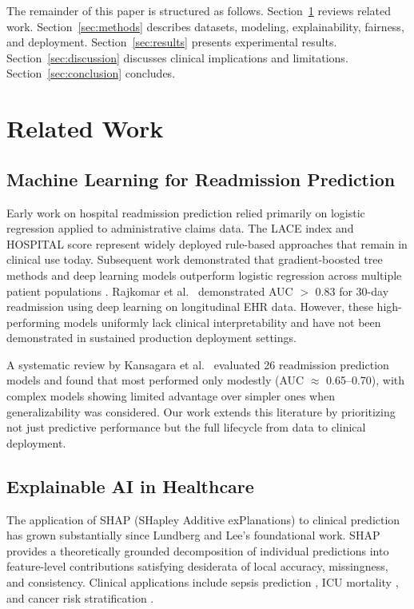 \documentclass[11pt,letterpaper]{article}
\begin{document}
The remainder of this paper is structured as follows. Section~\ref{sec:related} reviews related work. Section~\ref{sec:methods} describes datasets, modeling, explainability, fairness, and deployment. Section~\ref{sec:results} presents experimental results. Section~\ref{sec:discussion} discusses clinical implications and limitations. Section~\ref{sec:conclusion} concludes.

\section{Related Work}
\label{sec:related}

\subsection{Machine Learning for Readmission Prediction}

Early work on hospital readmission prediction relied primarily on logistic regression applied to administrative claims data. The LACE index \citep{van2010derivation} and HOSPITAL score \citep{donze2013potentially} represent widely deployed rule-based approaches that remain in clinical use today. Subsequent work demonstrated that gradient-boosted tree methods and deep learning models outperform logistic regression across multiple patient populations \citep{frizzell2017prediction,zheng2021deep}. Rajkomar et al.\ \citep{rajkomar2018scalable} demonstrated AUC $>$ 0.83 for 30-day readmission using deep learning on longitudinal EHR data. However, these high-performing models uniformly lack clinical interpretability and have not been demonstrated in sustained production deployment settings.

A systematic review by Kansagara et al.\ \citep{kansagara2011risk} evaluated 26 readmission prediction models and found that most performed only modestly (AUC $\approx$ 0.65--0.70), with complex models showing limited advantage over simpler ones when generalizability was considered. Our work extends this literature by prioritizing not just predictive performance but the full lifecycle from data to clinical deployment.

\subsection{Explainable AI in Healthcare}

The application of SHAP (SHapley Additive exPlanations) \citep{lundberg2017unified} to clinical prediction has grown substantially since Lundberg and Lee's foundational work. SHAP provides a theoretically grounded decomposition of individual predictions into feature-level contributions satisfying desiderata of local accuracy, missingness, and consistency. Clinical applications include sepsis prediction \citep{shillan2019machine}, ICU mortality \citep{johnson2023mimic}, and cancer risk stratification \citep{caruana2015intelligible}.
\end{document}
